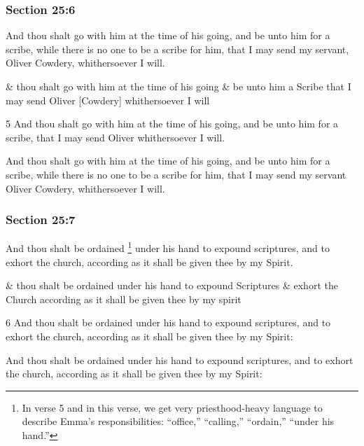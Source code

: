	\subsubsection{Section 25:6} %
		\label{DC25-6}

		And thou shalt go with him at the time of his going, and be unto him for a scribe, while there is no one to be a scribe for him, that I may send my servant, Oliver Cowdery, whithersoever I will.

		\begin{framed}
		\scriptsize
			\begin{compactdesc}
				\item[JSP] \& thou shalt go with him at the time of his going \& be unto him a Scribe that I may send Oliver [Cowdery] whithersoever I will
				\item[BC] 5 And thou shalt go with him at the time of his going, and be unto him for a scribe, that I may send Oliver whithersoever I will.
				\item[DC 1835] And thou shalt go with him at the time of his going, and be unto him for a scribe, while there is no one to be a scribe for him, that I may send my servant Oliver Cowdery, whithersoever I will.
			\end{compactdesc}
		\end{framed}

	\subsubsection{Section 25:7} %
		\label{DC25-7}

		And thou shalt be ordained%
			\footnote{%
				In verse 5 and in this verse, we get very priesthood-heavy language to describe Emma's responsibilities: ``office,'' ``calling,'' ``ordain,'' ``under his hand.'' 
				}
		under his hand to expound scriptures, and to exhort the church, according as it shall be given thee by my Spirit.

		\begin{framed}
		\scriptsize
			\begin{compactdesc}
				\item[JSP] \& thou shalt be ordained under his hand to expound Scriptures \& exhort the Church according as it shall be given thee by my spirit
				\item[BC] 6 And thou shalt be ordained under his hand to expound scriptures, and to exhort the church, according as it shall be given thee by my Spirit:
				\item[DC 1835] And thou shalt be ordained under his hand to expound scriptures, and to exhort the church, according as it shall be given thee by my Spirit:
			\end{compactdesc}
		\end{framed}


